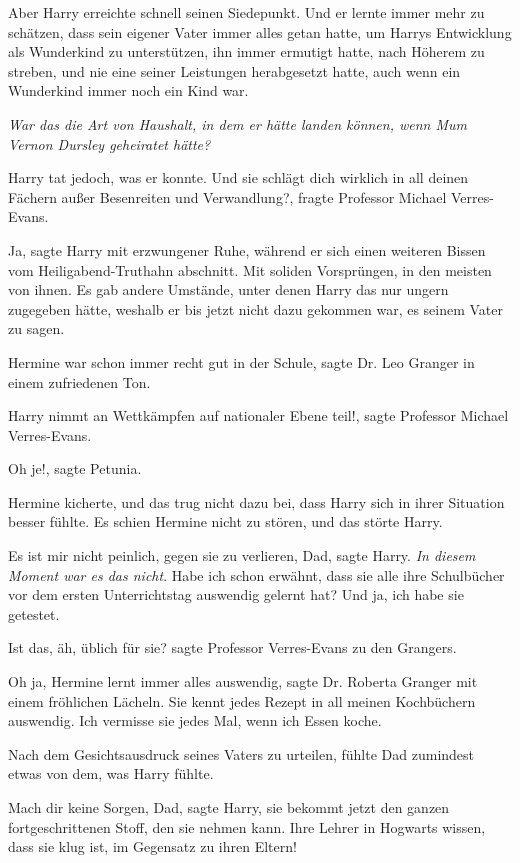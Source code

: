 Aber Harry erreichte schnell seinen Siedepunkt. Und er lernte immer mehr zu
schätzen, dass sein eigener Vater immer alles getan hatte, um Harrys Entwicklung
als Wunderkind zu unterstützen, ihn immer ermutigt hatte, nach Höherem zu
streben, und nie eine seiner Leistungen herabgesetzt hatte, auch wenn ein
Wunderkind immer noch ein Kind war.

\emph{War das die Art von Haushalt, in dem er hätte landen können, wenn Mum
Vernon Dursley geheiratet hätte?}

Harry tat jedoch, was er konnte. \glqq{}Und sie schlägt dich wirklich in all
deinen Fächern außer Besenreiten und Verwandlung?\grqq{}, fragte Professor
Michael Verres-Evans.

\glqq{}Ja\grqq{}, sagte Harry mit erzwungener Ruhe, während er sich einen
weiteren Bissen vom Heiligabend-Truthahn abschnitt. \glqq{}Mit soliden
Vorsprüngen, in den meisten von ihnen.\grqq{} Es gab andere Umstände, unter denen
Harry das nur ungern zugegeben hätte, weshalb er bis jetzt nicht dazu gekommen
war, es seinem Vater zu sagen.

\glqq{}Hermine war schon immer recht gut in der Schule\grqq{}, sagte Dr. Leo
Granger in einem zufriedenen Ton.

\glqq{}Harry nimmt an Wettkämpfen auf nationaler Ebene teil!\grqq{}, sagte
Professor Michael Verres-Evans.

\glqq{}Oh je!\grqq{}, sagte Petunia.

Hermine kicherte, und das trug nicht dazu bei, dass Harry sich in ihrer
Situation besser fühlte. Es schien Hermine nicht zu stören, und das störte
Harry.

\glqq{}Es ist mir nicht peinlich, gegen sie zu verlieren, Dad\grqq{}, sagte
Harry.\emph{ In diesem Moment war es das nicht}. \glqq{}Habe ich schon erwähnt,
dass sie alle ihre Schulbücher vor dem ersten Unterrichtstag auswendig gelernt
hat? Und ja, ich habe sie getestet.\grqq{}

\glqq{}Ist das, äh, üblich für sie?\grqq{} sagte Professor Verres-Evans zu den
Grangers.

\glqq{}Oh ja, Hermine lernt immer alles auswendig\grqq{}, sagte Dr. Roberta
Granger mit einem fröhlichen Lächeln. \glqq{}Sie kennt jedes Rezept in all meinen
Kochbüchern auswendig. Ich vermisse sie jedes Mal, wenn ich Essen koche.\grqq{}

Nach dem Gesichtsausdruck seines Vaters zu urteilen, fühlte Dad zumindest etwas
von dem, was Harry fühlte.

\glqq{}Mach dir keine Sorgen, Dad\grqq{}, sagte Harry, \glqq{}sie bekommt jetzt
den ganzen fortgeschrittenen Stoff, den sie nehmen kann. Ihre Lehrer in Hogwarts
wissen, dass sie klug ist, im Gegensatz zu ihren Eltern!\grqq{}

